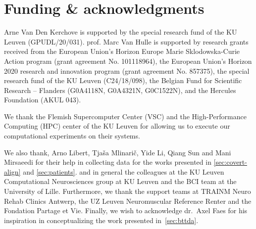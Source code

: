 \chapter*{Funding \& acknowledgments}

Arne Van Den Kerchove is supported by the special research fund of the KU Leuven
(GPUDL/20/031).
prof. Marc Van Hulle is supported by research grants received from
the European Union’s Horizon Europe Marie Sklodowska-Curie Action program
(grant agreement No. 101118964), the European Union’s Horizon 2020 research and
innovation program (grant agreement No. 857375), the special research fund of
the KU Leuven (C24/18/098), the Belgian Fund for Scientific Research – Flanders
(G0A4118N, G0A4321N, G0C1522N), and the Hercules
Foundation (AKUL 043).

We thank the Flemish Supercomputer Center (VSC) and the High-Performance
Computing (HPC) center of the KU Leuven for allowing us to execute our
computational experiments on their systems.

We also thank,  Arno Libert,
Tjaša Mlinarič, Yide Li, Qiang Sun and Mani Mirsaeedi for their help in collecting data
for the works presented in \autoref{sec:covert-align} and
\autoref{sec:patients}.
and in general the colleagues at the KU Leuven Computational Neurosciences
group at KU Leuven and the BCI team at the University of Lille.
Furthermore, we thank the support teams at TRAINM Neuro Rehab Clinics Antwerp,
the UZ Leuven Neuromuscular Reference Renter and the Fondation Partage et Vie.
Finally, we wish to acknowledge dr.\ Axel Faes for his inspiration in conceptualizing
the work presented in~\autoref{sec:bttda}.

